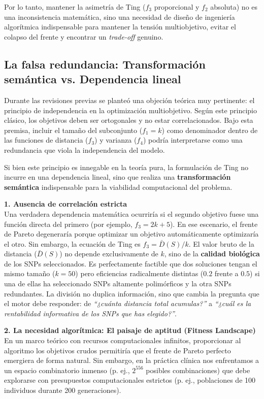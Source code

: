 \documentclass[11pt,a4paper]{article}
\begin{document}
Por lo tanto, mantener la asimetría de Ting ($f_3$ proporcional y $f_2$ absoluta) no es una inconsistencia matemática, sino una necesidad de diseño de ingeniería algorítmica indispensable para mantener la tensión multiobjetivo, evitar el colapso del frente y encontrar un \textit{trade-off} genuino.

\subsection{La falsa redundancia: Transformación semántica vs. Dependencia lineal}

Durante las revisiones previas se planteó una objeción teórica muy pertinente: el principio de independencia en la optimización multiobjetivo. Según este principio clásico, los objetivos deben ser ortogonales y no estar correlacionados. Bajo esta premisa, incluir el tamaño del subconjunto ($f_1 = k$) como denominador dentro de las funciones de distancia ($f_3$) y varianza ($f_4$) podría interpretarse como una redundancia que viola la independencia del modelo.

Si bien este principio es innegable en la teoría pura, la formulación de Ting no incurre en una dependencia lineal, sino que realiza una \textbf{transformación semántica} indispensable para la viabilidad computacional del problema.

\textbf{1. Ausencia de correlación estricta}\\
Una verdadera dependencia matemática ocurriría si el segundo objetivo fuese una función directa del primero (por ejemplo, $f_3 = 2k + 5$). En ese escenario, el frente de Pareto degeneraría porque optimizar un objetivo automáticamente optimizaría el otro. 
Sin embargo, la ecuación de Ting es $f_3 = \bar{D}(S) / k$. El valor bruto de la distancia ($\bar{D}(S)$) no depende exclusivamente de $k$, sino de la \textbf{calidad biológica} de los SNPs seleccionados. Es perfectamente factible que dos soluciones tengan el mismo tamaño ($k=50$) pero eficiencias radicalmente distintas ($0.2$ frente a $0.5$) si una de ellas ha seleccionado SNPs altamente polimórficos y la otra SNPs redundantes. La división no duplica información, sino que cambia la pregunta que el motor debe responder: de \textit{``¿cuánta distancia total acumulas?''} a \textit{``¿cuál es la rentabilidad informativa de los SNPs que has elegido?''}.

\textbf{2. La necesidad algorítmica: El paisaje de aptitud (Fitness Landscape)}\\
En un marco teórico con recursos computacionales infinitos, proporcionar al algoritmo los objetivos crudos permitiría que el frente de Pareto perfecto emergiera de forma natural. Sin embargo, en la práctica clínica nos enfrentamos a un espacio combinatorio inmenso (p. ej., $2^{556}$ posibles combinaciones) que debe explorarse con presupuestos computacionales estrictos (p. ej., poblaciones de 100 individuos durante 200 generaciones).
\end{document}
